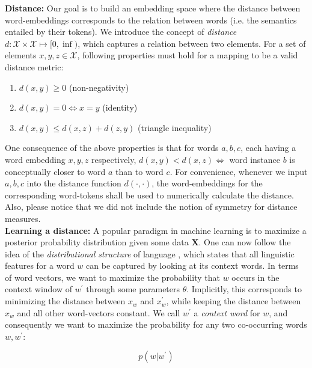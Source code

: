 \documentclass[a4paper,12pt,oneside,openright]{report}
\begin{document}
\textbf{Distance:} Our goal is to build an embedding space where the distance between word-embeddings corresponds to the relation between words (i.e. the semantics entailed by their tokens).
We introduce the concept of \textit{distance} $d : \mathcal{X}  \times \mathcal{X} \mapsto [ 0, \inf )$, which captures a relation between two elements. 
For a set of elements $x, y, z \in \mathcal{X}$, following properties must hold for a mapping to be a valid distance metric:

\begin{enumerate}
\item $d(x, y) \geq 0$ (non-negativity)
\item $d(x, y) = 0 \iff x = y$ (identity)
\item $d(x, y) \leq d(x, z) + d(z, y)$ (triangle inequality)
\end{enumerate}{\label{def:distance}}

One consequence of the above properties is that for words $a, b, c$, each having a word embedding $x, y, z$ respectively, $d(x, y) < d(x, z) \iff $ word instance $b$ is conceptually closer to word $a$ than to word $c$.
For convenience, whenever we input $a, b, c$ into the distance function $d(\cdot, \cdot)$, the word-embeddings for the corresponding word-tokens shall be used to numerically calculate the distance.
Also, please notice that we did not include the notion of symmetry for distance measures. \\

\textbf{Learning a distance:}
A popular paradigm in machine learning is to maximize a posterior probability distribution given some data $\mathbf{X}$.
One can now follow the idea of the \textit{distributional structure} of language \cite{harris54}, which states that all linguistic features for a word $w$ can be captured by looking at its context words.
In terms of word vectors, we want to maximize the probability that $w$ occurs in the context window of $w^{\prime}$ through some parameters $\theta$.
Implicitly, this corresponds to minimizing the distance between $x_w$ and $x_w^{\prime}$, while keeping the distance between $x_w$ and all other word-vectors constant. 
We call $w^{\prime}$ a \textit{context word} for $w$, and consequently we want to maximize the probability for any two co-occurring words $w, w^{\prime}$:

\begin{equation}
p \left(w | w^{\prime}\right) \nonumber
\end{equation}
\end{document}
